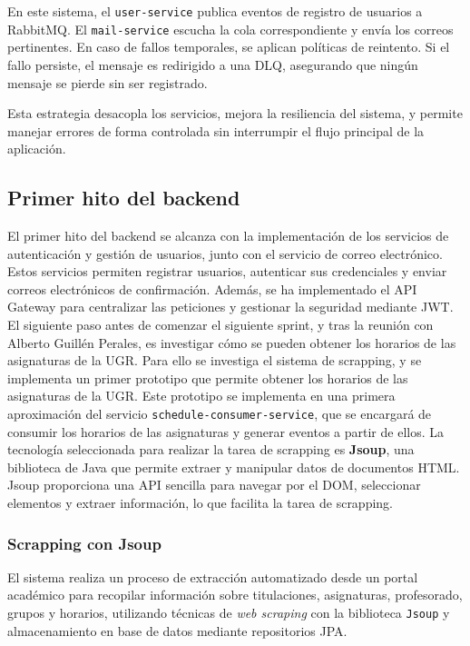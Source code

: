 En este sistema, el \texttt{user-service} publica eventos de registro de usuarios a RabbitMQ. El \texttt{mail-service} escucha la cola correspondiente y envía los correos pertinentes. En caso de fallos temporales, se aplican políticas de reintento. Si el fallo persiste, el mensaje es redirigido a una DLQ, asegurando que ningún mensaje se pierde sin ser registrado.

Esta estrategia desacopla los servicios, mejora la resiliencia del sistema, y permite manejar errores de forma controlada sin interrumpir el flujo principal de la aplicación.

\subsection{Primer hito del backend}
El primer hito del backend se alcanza con la implementación de los servicios de autenticación y gestión de usuarios, junto con el servicio de correo electrónico. Estos servicios permiten registrar usuarios, autenticar sus credenciales y enviar correos electrónicos de confirmación. Además, se ha implementado el API Gateway para centralizar las peticiones y gestionar la seguridad mediante JWT.
\newline\newline
El siguiente paso antes de comenzar el siguiente sprint, y tras la reunión con Alberto Guillén Perales, es investigar cómo se pueden obtener los horarios de las asignaturas de la UGR.
\newline\newline
Para ello se investiga el sistema de scrapping, y se implementa un primer prototipo que permite obtener los horarios de las asignaturas de la UGR. Este prototipo se implementa en una primera aproximación del servicio \texttt{schedule-consumer-service}, que se encargará de consumir los horarios de las asignaturas y generar eventos a partir de ellos.
\newline
La tecnología seleccionada para realizar la tarea de scrapping es \textbf{Jsoup}, una biblioteca de Java que permite extraer y manipular datos de documentos HTML. Jsoup proporciona una API sencilla para navegar por el DOM, seleccionar elementos y extraer información, lo que facilita la tarea de scrapping.

\subsubsection{Scrapping con Jsoup}

El sistema realiza un proceso de extracción automatizado desde un portal académico para recopilar información sobre titulaciones, asignaturas, profesorado, grupos y horarios, utilizando técnicas de \textit{web scraping} con la biblioteca \texttt{Jsoup} y almacenamiento en base de datos mediante repositorios JPA.

